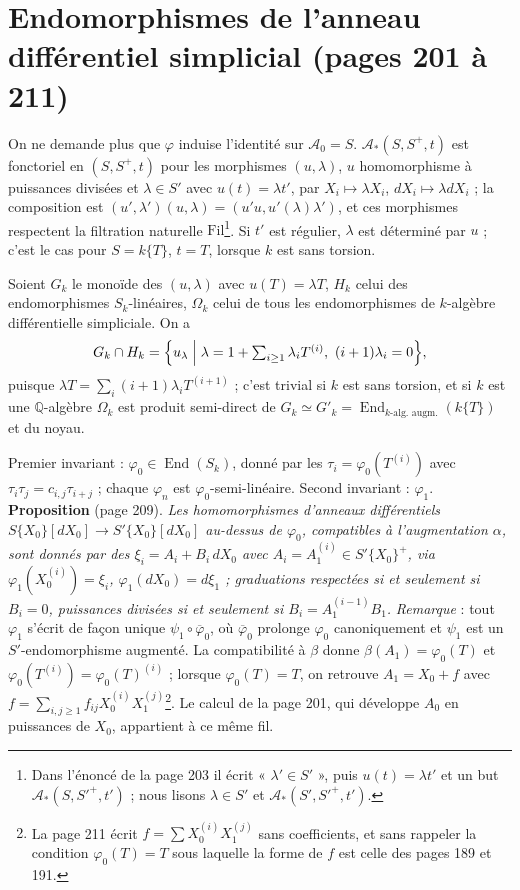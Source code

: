 \documentclass[11pt,a4paper]{article}
\begin{document}
\section*{Endomorphismes de l'anneau différentiel simplicial (pages 201 à 211)}

On ne demande plus que $\varphi$ induise l'identité sur $\mathcal{A}_0 = S$.
$\mathcal{A}_*(S, S^+, t)$ est fonctoriel en $(S, S^+, t)$ pour les morphismes
$(u, \lambda)$, $u$ homomorphisme à puissances divisées et $\lambda \in S'$ avec
$u(t) = \lambda t'$, par $X_i \mapsto \lambda X_i$, $dX_i \mapsto \lambda dX_i$ ;
la composition est $(u', \lambda')(u, \lambda) = (u'u, u'(\lambda)\lambda')$, et
ces morphismes respectent la filtration naturelle $\mathrm{Fil}$\footnote{Dans
l'énoncé de la page 203 il écrit « $\lambda' \in S'$ », puis $u(t) = \lambda
t'$ et un but $\mathcal{A}_*(S, S'^+, t')$ ; nous lisons $\lambda \in S'$ et
$\mathcal{A}_*(S', S'^+, t')$.}. Si $t'$ est régulier, $\lambda$ est déterminé
par $u$ ; c'est le cas pour $S = k\{T\}$, $t = T$, lorsque $k$ est sans
torsion.

Soient $G_k$ le monoïde des $(u, \lambda)$ avec $u(T) = \lambda T$, $H_k$ celui
des endomorphismes $S_k$-linéaires, $\Omega_k$ celui de tous les
endomorphismes de $k$-algèbre différentielle simpliciale. On a
\[
G_k \cap H_k = \Bigl\{u_\lambda \Bigm| \lambda = 1 + \textstyle\sum_{i \geq 1}\lambda_iT^{(i)},\ (i+1)\lambda_i = 0\Bigr\} ,
\]
puisque $\lambda T = \sum_i (i+1)\lambda_iT^{(i+1)}$ ; c'est trivial si $k$ est
sans torsion, et si $k$ est une $\mathbb{Q}$-algèbre $\Omega_k$ est produit
semi-direct de $G_k \simeq G'_k = \operatorname{End}_{k\text{-alg.\ augm.}}(k\{T\})$ et du noyau.

Premier invariant : $\varphi_0 \in \operatorname{End}(S_k)$, donné par les
$\tau_i = \varphi_0(T^{(i)})$ avec $\tau_i\tau_j = c_{i,j}\tau_{i+j}$ ; chaque
$\varphi_n$ est $\varphi_0$-semi-linéaire. Second invariant : $\varphi_1$.
\textbf{Proposition} (page 209). \emph{Les homomorphismes d'anneaux
différentiels $S\{X_0\}[dX_0] \to S'\{X_0\}[dX_0]$ au-dessus de $\varphi_0$,
compatibles à l'augmentation $\alpha$, sont donnés par des $\xi_i = A_i +
B_i\,dX_0$ avec $A_i = A_1^{(i)} \in S'\{X_0\}^+$, via $\varphi_1(X_0^{(i)}) =
\xi_i$, $\varphi_1(dX_0) = d\xi_1$ ; graduations respectées si et seulement si
$B_i = 0$, puissances divisées si et seulement si $B_i = A_1^{(i-1)}B_1$.}
\emph{Remarque} : tout $\varphi_1$ s'écrit de façon unique $\psi_1 \circ
\overline{\varphi}_0$, où $\overline{\varphi}_0$ prolonge $\varphi_0$
canoniquement et $\psi_1$ est un $S'$-endomorphisme augmenté. La compatibilité
à $\beta$ donne $\beta(A_1) = \varphi_0(T)$ et $\varphi_0(T^{(i)}) =
\varphi_0(T)^{(i)}$ ; lorsque $\varphi_0(T) = T$, on retrouve $A_1 = X_0 + f$
avec $f = \sum_{i,j \geq 1} f_{ij}X_0^{(i)}X_1^{(j)}$\footnote{La page 211 écrit
$f = \sum X_0^{(i)}X_1^{(j)}$ sans coefficients, et sans rappeler la condition
$\varphi_0(T) = T$ sous laquelle la forme de $f$ est celle des pages 189 et
191.}. Le calcul de la page 201, qui développe $A_0$ en puissances de $X_0$,
appartient à ce même fil.
\end{document}
